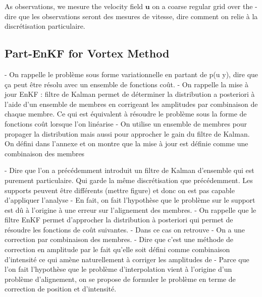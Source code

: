 As observations, we mesure the velocity field $\bm u$ on a coarse regular grid over the
- dire que les observations seront des mesures de vitesse, dire comment on relie à la discrétisation particulaire.

\subsection*{Part-EnKF for Vortex Method}

- On rappelle le problème sous forme variationnelle en partant de p(u \mid y), dire que ça peut être résolu avec un ensemble de fonctions coût.
- On rappelle la mise à jour EnKF : filtre de Kalman permet de déterminer la distribution a posteriori à l'aide d'un ensemble de membres en corrigeant les amplitudes par combinaison de chaque membre. Ce qui est équivalent à résoudre le problème sous la forme de fonctions coût lorsque l'on linéarise
- On utilise un ensemble de membres pour propager la distribution mais aussi pour approcher le gain du filtre de Kalman. On défini dans l'annexe et on montre que la mise à jour est définie comme une combinaison des membres

- Dire que l'on a précédemment introduit un filtre de Kalman d'ensemble qui est purement particulaire. Qui garde la même discrétisation que précédemment. Les supports peuvent être différents (mettre figure) et donc on est pas capable d'appliquer l'analyse
- En fait, on fait l'hypothèse que le problème sur le support est dû à l'origine à une erreur sur l'alignement des membres.%
- On rappelle que le filtre EnKF permet d'approcher la distribution à posteriori qui permet de résoudre les fonctions de coût suivantes.
- Dans ce cas on retrouve
- On a une correction par combinaison des membres.
- Dire que c'est une méthode de correction en amplitude par le fait qu'elle soit défini comme combinaison d'intensité ce qui amène naturellement à corriger les amplitudes de
- Parce que l'on fait l'hypothèse que le problème d'interpolation vient à l'origine d'un problème d'alignement, on se propose de formuler le problème en terme de correction de position et d'intensité.